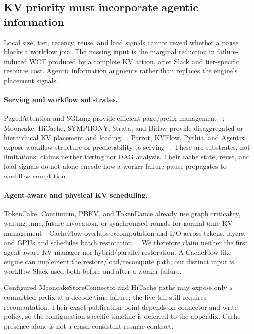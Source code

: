 \subsection{KV priority must incorporate agentic information}

Local size, tier, recency, reuse, and load signals cannot reveal whether a
pause blocks a workflow join.  The missing input is the marginal reduction in
failure-induced WCT produced by a complete KV action, after Slack and
tier-specific resource cost.  Agentic information augments rather than replaces
the engine's placement signals.

\paragraph{Serving and workflow substrates.}
PagedAttention and SGLang provide efficient page/prefix management
~\cite{kwon2023vllm,zheng2024sglang}; Mooncake, HiCache, SYMPHONY, Strata, and
Bidaw provide disaggregated or hierarchical KV placement and loading
~\cite{qin2025mooncake,xie2025hicache,agarwal2026symphony,
xie2026strata,hu2026bidaw}.  Parrot, KVFlow, Pythia, and Agentix expose
workflow structure or predictability to serving
~\cite{lin2024parrot,pan2025kvflow,yu2026pythia,luo2026agentix}.
These are substrates, not limitations: \system{} claims neither tiering nor
DAG analysis.  Their cache state, reuse, and load signals do not alone encode
how a worker-failure pause propagates to workflow completion.

\paragraph{Agent-aware and physical KV scheduling.}
TokenCake, Continuum, PBKV, and TokenDance already use graph criticality,
waiting time, future invocation, or synchronized rounds for normal-time KV
management~\cite{bian2026tokencake,li2026continuum,
zheng2026pbkv,bian2026tokendance}.  CacheFlow overlaps recomputation and I/O
across tokens, layers, and GPUs and schedules batch restoration
~\cite{nian2026cacheflow}.  We therefore claim neither the first agent-aware
KV manager nor hybrid/parallel restoration.  A CacheFlow-like engine can
implement the restore/load/recompute path; our distinct input is workflow
Slack used both before and after a worker failure.

Configured MooncakeStoreConnector and HiCache paths may expose only a committed
prefix at a decode-time failure; the live tail still requires recomputation.
Their exact publication point depends on connector and write policy, so the
configuration-specific timeline is deferred to the appendix.  Cache presence
alone is not a crash-consistent resume contract.

